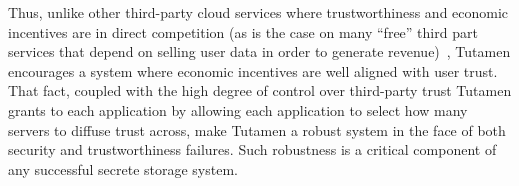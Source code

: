 Thus, unlike other third-party cloud services where trustworthiness
and economic incentives are in direct competition (as is the case on
many ``free'' third part services that depend on selling user data in
order to generate revenue)~\cite{flowerday2006}, Tutamen encourages a
system where economic incentives are well aligned with user
trust. That fact, coupled with the high degree of control over
third-party trust Tutamen grants to each application by allowing each
application to select how many servers to diffuse trust across, make
Tutamen a robust system in the face of both security and
trustworthiness failures. Such robustness is a critical component of
any successful secrete storage system.

